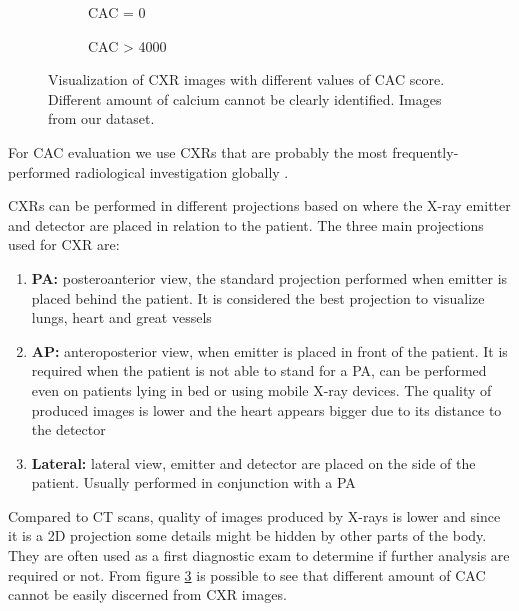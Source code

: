 \begin{figure}
    \centering
    \begin{subfigure}[b]{0.4\textwidth}
        \caption{CAC = 0}
        \label{subfig:cxr_cac_0}
    \end{subfigure}\hspace{1em}
    \begin{subfigure}[b]{0.4\textwidth}
        \caption{CAC > 4000}
        \label{subfig:cxr_cac_4000}
    \end{subfigure}
    
    \caption{Visualization of CXR images with different values of CAC score. Different amount of calcium cannot be clearly identified. Images from our dataset.}
    \label{fig:cxr_cacs}
\end{figure}

For CAC evaluation we use CXRs that are probably the most frequently-performed radiological investigation globally \cite{chest_radiograph}.

CXRs can be performed in different projections based on where the X-ray emitter and detector are placed in relation to the patient.
The three main projections used for CXR are:
\begin{enumerate}
    \item \textbf{PA:} posteroanterior view, the standard projection performed when emitter is placed behind the patient. It is considered the best projection to visualize lungs, heart and great vessels \cite{chest_radiograph}
    \item \textbf{AP:} anteroposterior view, when emitter is placed in front of the patient. It is required when the patient is not able to stand for a PA, can be performed even on patients lying in bed or using mobile X-ray devices. The quality of produced images is lower and the heart appears bigger due to its distance to the detector
    \item \textbf{Lateral:} lateral view, emitter and detector are placed on the side of the patient. Usually performed in conjunction with a PA
\end{enumerate}

Compared to CT scans, quality of images produced by X-rays is lower and since it is a 2D projection some details might be hidden by other parts of the body.
They are often used as a first diagnostic exam to determine if further analysis are required or not.
From figure \ref{fig:cxr_cacs} is possible to see that different amount of CAC cannot be easily discerned from CXR images.


